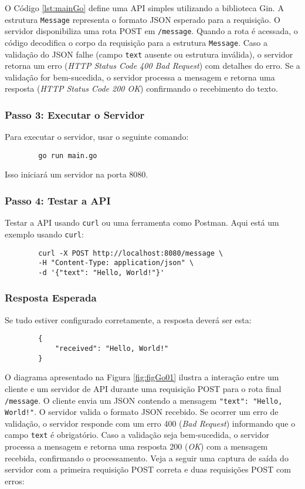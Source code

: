 O Código \ref{lst:mainGo} define uma API simples utilizando a biblioteca Gin. A estrutura \verb|Message| representa o formato JSON esperado para a requisição. O servidor disponibiliza uma rota POST em \verb|/message|. Quando a rota é acessada, o código decodifica o corpo da requisição para a estrutura \verb|Message|. Caso a validação do JSON falhe (campo \verb|text| ausente ou estrutura inválida), o servidor retorna um erro (\textit{HTTP Status Code 400 Bad Request}) com detalhes do erro. Se a validação for bem-sucedida, o servidor processa a mensagem e retorna uma resposta (\textit{HTTP Status Code 200 OK}) confirmando o recebimento do texto.

\subsubsection{Passo 3: Executar o Servidor}

Para executar o servidor, usar o seguinte comando:

\begin{verbatim}
        go run main.go
\end{verbatim}

Isso iniciará um servidor na porta 8080.

\subsubsection{Passo 4: Testar a API}

Testar a API usando \texttt{curl} ou uma ferramenta como Postman. Aqui está um exemplo usando \texttt{curl}:

\begin{verbatim}
        curl -X POST http://localhost:8080/message \
        -H "Content-Type: application/json" \
        -d '{"text": "Hello, World!"}'
\end{verbatim}

\subsubsection{Resposta Esperada}

Se tudo estiver configurado corretamente, a resposta deverá ser esta:

\begin{verbatim}
        {
            "received": "Hello, World!"
        }
\end{verbatim}

O diagrama apresentado na Figura \ref{fig:figGo01} ilustra a interação entre um cliente e um servidor de API durante uma requisição POST para o rota final \texttt{/message}. O cliente envia um JSON contendo a mensagem \texttt{"text": "Hello, World!"}. O servidor valida o formato JSON recebido. Se ocorrer um erro de validação, o servidor responde com um erro 400 (\textit{Bad Request}) informando que o campo \texttt{text} é obrigatório. Caso a validação seja bem-sucedida, o servidor processa a mensagem e retorna uma resposta 200 (\textit{OK}) com a mensagem recebida, confirmando o processamento. Veja a seguir uma captura de saída do servidor com a primeira requisição POST correta e duas requisições POST com erros:


